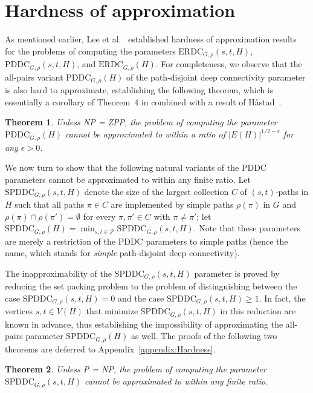 \LongVersion \documentclass[11pt]{article}
\newtheorem{theorem}{Theorem}[section]
\theoremstyle{definition}
\theoremstyle{plain}
\newcommand{\Vertices}[0]{\mathit{V}}
\newcommand{\Edges}[0]{\mathit{E}}
\newcommand{\Peers}[0]{\mathcal{P}}
\newcommand{\ERDC}[0]{\mathrm{ERDC}}
\newcommand{\PDDC}[0]{\mathrm{PDDC}}
\newcommand{\SPDDC}[0]{\mathrm{SPDDC}}
\begin{document}
\section{Hardness of approximation}
\label{section:HardnessApproximation}


As mentioned earlier, Lee et al.~\cite{prev} established hardness of
approximation results for the problems of computing the parameters $\ERDC_{G,
\rho}(s, t, H)$, $\PDDC_{G, \rho}(s, t, H)$, and $\ERDC_{G, \rho}(H)$.
For completeness, we observe that the all-pairs variant $\PDDC_{G, \rho}(H)$
of the path-disjoint deep connectivity parameter is also hard to approximate,
establishing the following theorem, which is essentially a corollary of
Theorem~4 in \cite{prev} combined with a result of H{\aa}stad~\cite{Hast99}.

\begin{theorem} \label{theorem:HardnessAllPairsPDDC}
Unless NP = ZPP, the problem of computing the parameter $\PDDC_{G, \rho}(H)$
cannot be approximated to within a ratio of $|\Edges(H)|^{1 / 2 - \epsilon}$
for any $\epsilon > 0$.
\end{theorem}

We now turn to show that the following natural variants of the $\PDDC$
parameters cannot be approximated to within any finite ratio.
Let $\SPDDC_{G, \rho}(s, t, H)$ denote the size of the largest collection $C$
of $(s, t)$-paths in $H$ such that all paths $\pi \in C$ are implemented by
simple paths $\rho(\pi)$ in $G$ and $\rho(\pi) \cap \rho(\pi') = \emptyset$
for every $\pi, \pi' \in C$ with $\pi \neq \pi'$;
let $\SPDDC_{G, \rho}(H) = \min_{s, t \in \Peers} \SPDDC_{G, \rho}(s, t, H)$.
Note that these parameters are merely a restriction of the $\PDDC$ parameters
to simple paths (hence the name, which stands for \emph{simple} path-disjoint
deep connectivity).

The inapproximability of the $\SPDDC_{G, \rho}(s, t, H)$ parameter is proved
by reducing the set packing problem to the problem of distinguishing between
the case $\SPDDC_{G, \rho}(s, t, H) = 0$ and the case $\SPDDC_{G, \rho}(s, t,
H) \geq 1$.
In fact, the vertices $s, t \in \Vertices(H)$ that minimize $\SPDDC_{G,
\rho}(s, t, H)$ in this reduction are known in advance, thus establishing the
impossibility of approximating the all-pairs parameter $\SPDDC_{G, \rho}(H)$
as well.
The proofs of the following two theorems are deferred to
Appendix~\ref{appendix:Hardness}.


\begin{theorem} \label{theorem:HardnessSPDDC}
Unless P = NP, the problem of computing the parameter $\SPDDC_{G, \rho}(s,
t, H)$ cannot be approximated to within any finite ratio.
\end{theorem}
\end{document}
